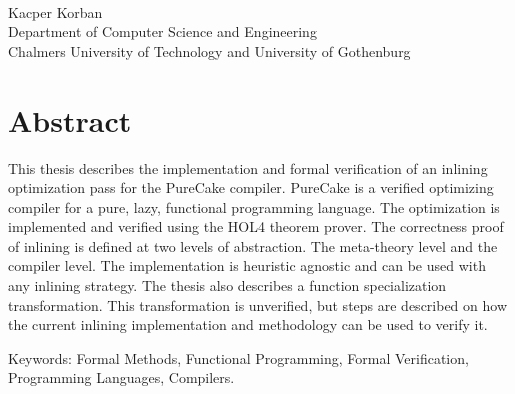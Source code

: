 \oneLineTitle\\
Kacper Korban\\
Department of Computer Science and Engineering\\
Chalmers University of Technology and University of Gothenburg\setlength{\parskip}{0.5cm}

\thispagestyle{plain}			%
\setlength{\parskip}{0pt plus 1.0pt}
\section*{Abstract}
This thesis describes the implementation and formal verification of an inlining
optimization pass for the PureCake compiler. PureCake is a verified optimizing
compiler for a pure, lazy, functional programming language. The optimization is
implemented and verified using the HOL4 theorem prover. The correctness proof of
inlining is defined at two levels of abstraction. The meta-theory level and the
compiler level. The implementation is heuristic agnostic and can be used with
any inlining strategy. The thesis also describes a function specialization
transformation. This transformation is unverified, but steps are described on
how the current inlining implementation and methodology can be used to verify
it.

\vfill
Keywords: Formal Methods, Functional Programming, Formal Verification, Programming Languages, Compilers.

\newpage				%
\thispagestyle{empty}
\mbox{}